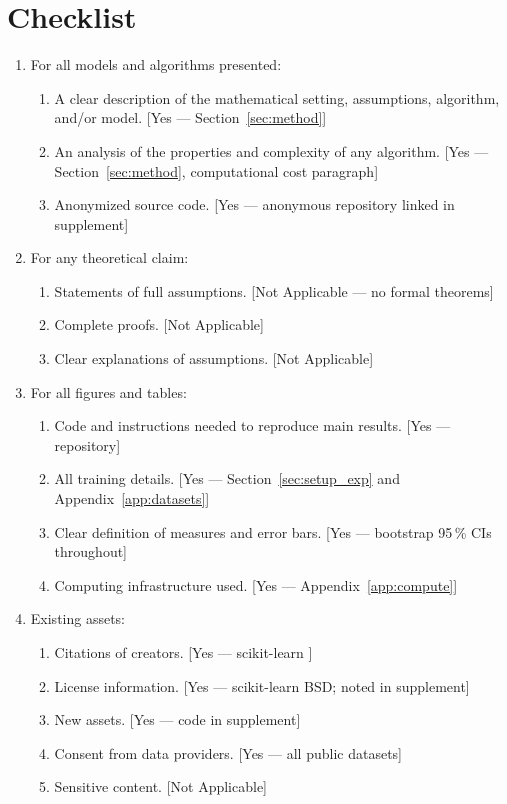 \documentclass[twoside]{article}
\begin{document}
\section*{Checklist}

\begin{enumerate}

  \item For all models and algorithms presented:
  \begin{enumerate}
    \item A clear description of the mathematical setting, assumptions, algorithm, and/or model. [Yes --- Section~\ref{sec:method}]
    \item An analysis of the properties and complexity of any algorithm. [Yes --- Section~\ref{sec:method}, computational cost paragraph]
    \item Anonymized source code. [Yes --- anonymous repository linked in supplement]
  \end{enumerate}

  \item For any theoretical claim:
  \begin{enumerate}
    \item Statements of full assumptions. [Not Applicable --- no formal theorems]
    \item Complete proofs. [Not Applicable]
    \item Clear explanations of assumptions. [Not Applicable]
  \end{enumerate}

  \item For all figures and tables:
  \begin{enumerate}
    \item Code and instructions needed to reproduce main results. [Yes --- repository]
    \item All training details. [Yes --- Section~\ref{sec:setup_exp} and Appendix~\ref{app:datasets}]
    \item Clear definition of measures and error bars. [Yes --- bootstrap 95\,\% CIs throughout]
    \item Computing infrastructure used. [Yes --- Appendix~\ref{app:compute}]
  \end{enumerate}

  \item Existing assets:
  \begin{enumerate}
    \item Citations of creators. [Yes --- scikit-learn \citep{pedregosa2011scikit}]
    \item License information. [Yes --- scikit-learn BSD; noted in supplement]
    \item New assets. [Yes --- code in supplement]
    \item Consent from data providers. [Yes --- all public datasets]
    \item Sensitive content. [Not Applicable]
  \end{enumerate}


\end{enumerate}
\end{document}
